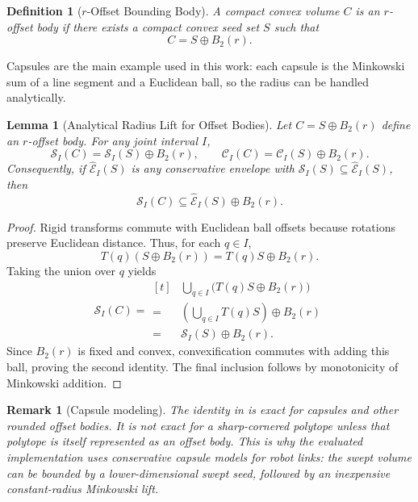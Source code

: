 \documentclass[journal]{IEEEtran}
\newtheorem{definition}{Definition}
\newtheorem{remark}{Remark}
\newtheorem{lemma}{Lemma}
\begin{document}
\begin{definition}[$r$-Offset Bounding Body]
A compact convex volume $C$ is an $r$-offset body if there exists a compact
convex seed set $S$ such that
\[
C = S \oplus B_2(r).
\]
\end{definition}

Capsules are the main example used in this work: each capsule is the Minkowski
sum of a line segment and a Euclidean ball, so the radius can be handled
analytically.

\begin{lemma}[Analytical Radius Lift for Offset Bodies]\label{lem:offset_lift}
Let $C = S \oplus B_2(r)$ define an $r$-offset body. For any joint interval $I$,
\[
\mathcal{S}_I(C) = \mathcal{S}_I(S) \oplus B_2(r),
\qquad
\mathcal{C}_I(C) = \mathcal{C}_I(S) \oplus B_2(r).
\]
Consequently, if $\widehat{\mathcal{E}}_I(S)$ is any conservative envelope with
$\mathcal{S}_I(S) \subseteq \widehat{\mathcal{E}}_I(S)$, then
\[
\mathcal{S}_I(C) \subseteq \widehat{\mathcal{E}}_I(S) \oplus B_2(r).
\]
\end{lemma}

\begin{proof}
Rigid transforms commute with Euclidean ball offsets because rotations preserve
Euclidean distance. Thus, for each $q \in I$,
\[
T(q)(S \oplus B_2(r)) = T(q)S \oplus B_2(r).
\]
Taking the union over $q$ yields
\[
\mathcal{S}_I(C)
= \begin{aligned}[t]
&\bigcup_{q\in I} \bigl(T(q)S \oplus B_2(r)\bigr) \\
=\;&\left(\bigcup_{q\in I} T(q)S\right) \oplus B_2(r) \\
=\;&\mathcal{S}_I(S) \oplus B_2(r).
\end{aligned}
\]
Since $B_2(r)$ is fixed and convex, convexification commutes with adding this
ball, proving the second identity. The final inclusion follows by monotonicity
of Minkowski addition.
\end{proof}

\begin{remark}[Capsule modeling]\label{rem:capsule_exact}
The identity in  is exact for capsules and other rounded
offset bodies. It is not exact for a sharp-cornered polytope unless that
polytope is itself represented as an offset body. This is why the evaluated
implementation uses conservative capsule models for robot links: the swept
volume can be bounded by a lower-dimensional swept seed, followed by an
inexpensive constant-radius Minkowski lift.
\end{remark}
\end{document}
